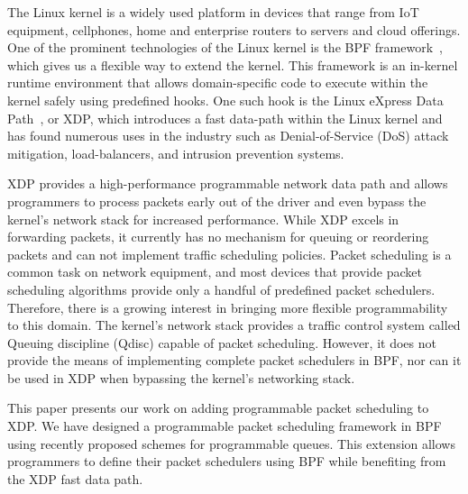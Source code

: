 \documentclass[sigconf, nonacm]{acmart}
\begin{document}
The Linux kernel is a widely used platform in devices that range from IoT equipment, cellphones, home and enterprise routers to servers and cloud offerings. One of the prominent technologies of the Linux kernel is the BPF framework~\cite{ebpf}, which gives us a flexible way to extend the kernel. This framework is an in-kernel runtime environment that allows domain-specific code to execute within the kernel safely using predefined hooks. One such hook is the Linux eXpress Data Path~\cite{hoiland2018express}, or XDP, which introduces a fast data-path within the Linux kernel and has found numerous uses in the industry such as Denial-of-Service (DoS) attack mitigation, load-balancers, and intrusion prevention systems.

XDP provides a high-performance programmable network data path and allows programmers to process packets early out of the driver and even bypass the kernel's network stack for increased performance. While XDP excels in forwarding packets, it currently has no mechanism for queuing or reordering packets and can not implement traffic scheduling policies. Packet scheduling is a common task on network equipment, and most devices that provide packet scheduling algorithms provide only a handful of predefined packet schedulers. Therefore, there is a growing interest in bringing more flexible programmability to this domain. The kernel's network stack provides a traffic control system called Queuing discipline (Qdisc) capable of packet scheduling. However, it does not provide the means of implementing complete packet schedulers in BPF, nor can it be used in XDP when bypassing the kernel's networking stack.


This paper presents our work on adding programmable packet scheduling to XDP. We have designed a programmable packet scheduling framework in BPF using recently proposed schemes for programmable queues. This extension allows programmers to define their packet schedulers using BPF while benefiting from the XDP fast data path.


\end{document}
